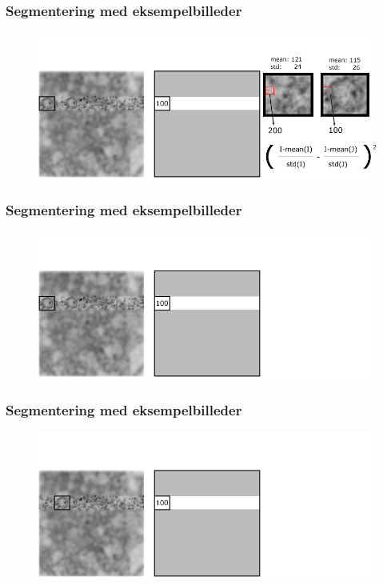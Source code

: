 \documentclass[12pt,t]{beamer}
\begin{document}
\begin{frame}
\frametitle{Segmentering med eksempelbilleder}
\begin{figure}[H]
\includegraphics[scale=0.35]{img/afstand/9.png}
\end{figure}
\end{frame}

\begin{frame}
\frametitle{Segmentering med eksempelbilleder}
\begin{figure}[H]
\includegraphics[scale=0.35]{img/afstand/10.png}
\end{figure}
\end{frame}

\begin{frame}
\frametitle{Segmentering med eksempelbilleder}
\begin{figure}[H]
\includegraphics[scale=0.35]{img/afstand/11.png}
\end{figure}
\end{frame}
\end{document}

